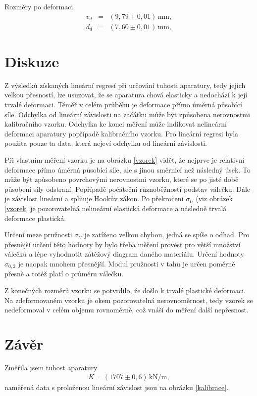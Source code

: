 \documentclass[a4paper,12pt]{article}
\begin{document}
Rozměry po deformaci
\begin{eqnarray}
\nonumber v_d &=& (9,79 \pm 0,01) \, \mathrm{mm},\\
\nonumber d_d &=& (7,60 \pm 0,01) \, \mathrm{mm},
\end{eqnarray}

\section{Diskuze}
Z výsledků získaných lineární regresí při určování tuhosti aparatury, 
tedy jejich velkou přesností, lze
usuzovat, že se aparatura chová elasticky a nedochází k její trvalé deformaci.
Téměř v celém průběhu je deformace přímo úměrná působící síle.
Odchylka od lineární závislosti na začátku může být způsobena nerovnostmi
kalibračního vzorku. Odchylka ke konci měření může indikovat nelineární deformaci 
aparatury popřípadě kalibračního vzorku. Pro lineární regresi byla použita 
pouze ta data, která nejeví odchylku od lineární závislosti.

Při vlastním měření vzorku je na obrázku \ref{vzorek} vidět, že nejprve je relativní 
deformace přímo úměrná působící síle, ale s jinou směrnicí než následný úsek.
To může být způsobeno povrchovými nerovnostmi vzorku, které se po jisté 
době působení síly odstraní. Popřípadě počáteční různoběžností podstav válečku.
Dále je závislost lineární a splňuje Hookův 
zákon. Po překročení $\sigma_U$ (viz obrázek \ref{vzorek} je pozorovatelná 
nelineární elastická deformace a následně trvalá deformace plastická.

Určení meze pružnosti $\sigma_U$ je zatíženo velkou chybou, jedná se spíše o odhad. 
Pro přesnější určení této hodnoty by bylo třeba měření provést pro větší množství
válečků a lépe vyhodnotit zátěžový diagram daného materiálu.
Určení hodnoty $\sigma_{0,2}$ je naopak mnohem přesnější. Modul pružnosti 
v tahu je určen poměrně přesně a totéž platí o průměru válečku.

Z konečných rozměrů vzorku se potvrdilo, že došlo k trvalé plastické deformaci.
Na zdeformovaném vzorku je okem pozorovatelná nerovnoměrnost, tedy vzorek 
se nedeformoval v celém objemu rovnoměrně, což vnáší do měření další nepřesnost.


\section{Závěr}
Změřila jsem tuhost aparatury 
\begin{eqnarray}
\nonumber K= (1707 \pm 0,6) \, \mathrm{kN/m},
\end{eqnarray}
naměřená data s proloženou lineární závislost jsou na obrázku \ref{kalibrace}.
\end{document}
